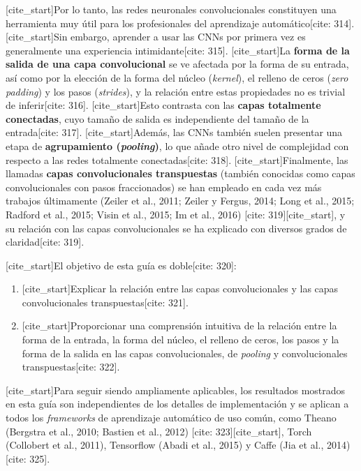 \documentclass[
  super,
  preprint,
  3p]{elsarticle}
\providecommand{\tightlist}{%
  \setlength{\itemsep}{0pt}\setlength{\parskip}{0pt}}\usepackage{longtable,booktabs,array}
\begin{document}
{[}cite\_start{]}Por lo tanto, las redes neuronales convolucionales
constituyen una herramienta muy útil para los profesionales del
aprendizaje automático{[}cite: 314{]}. {[}cite\_start{]}Sin embargo,
aprender a usar las CNNs por primera vez es generalmente una experiencia
intimidante{[}cite: 315{]}. {[}cite\_start{]}La \textbf{forma de la
salida de una capa convolucional} se ve afectada por la forma de su
entrada, así como por la elección de la forma del núcleo
(\emph{kernel}), el relleno de ceros (\emph{zero padding}) y los pasos
(\emph{strides}), y la relación entre estas propiedades no es trivial de
inferir{[}cite: 316{]}. {[}cite\_start{]}Esto contrasta con las
\textbf{capas totalmente conectadas}, cuyo tamaño de salida es
independiente del tamaño de la entrada{[}cite: 317{]}.
{[}cite\_start{]}Además, las CNNs también suelen presentar una etapa de
\textbf{agrupamiento (\emph{pooling})}, lo que añade otro nivel de
complejidad con respecto a las redes totalmente conectadas{[}cite:
318{]}. {[}cite\_start{]}Finalmente, las llamadas \textbf{capas
convolucionales transpuestas} (también conocidas como capas
convolucionales con pasos fraccionados) se han empleado en cada vez más
trabajos últimamente (Zeiler et al., 2011; Zeiler y Fergus, 2014; Long
et al., 2015; Radford et al., 2015; Visin et al., 2015; Im et al., 2016)
{[}cite: 319{]}{[}cite\_start{]}, y su relación con las capas
convolucionales se ha explicado con diversos grados de claridad{[}cite:
319{]}.

{[}cite\_start{]}El objetivo de esta guía es doble{[}cite: 320{]}:

\begin{enumerate}
\def\labelenumi{\arabic{enumi}.}
\tightlist
\item
  {[}cite\_start{]}Explicar la relación entre las capas convolucionales
  y las capas convolucionales transpuestas{[}cite: 321{]}.
\item
  {[}cite\_start{]}Proporcionar una comprensión intuitiva de la relación
  entre la forma de la entrada, la forma del núcleo, el relleno de
  ceros, los pasos y la forma de la salida en las capas convolucionales,
  de \emph{pooling} y convolucionales transpuestas{[}cite: 322{]}.
\end{enumerate}

{[}cite\_start{]}Para seguir siendo ampliamente aplicables, los
resultados mostrados en esta guía son independientes de los detalles de
implementación y se aplican a todos los \emph{frameworks} de aprendizaje
automático de uso común, como Theano (Bergstra et al., 2010; Bastien et
al., 2012) {[}cite: 323{]}{[}cite\_start{]}, Torch (Collobert et al.,
2011), Tensorflow (Abadi et al., 2015) y Caffe (Jia et al.,
2014){[}cite: 325{]}.
\end{document}
